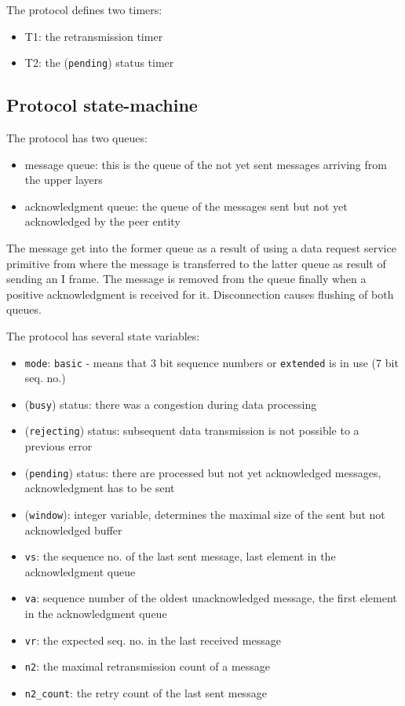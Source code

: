 \documentclass[a4paper]{article}
\begin{document}
The protocol defines two timers:
\begin{itemize}
    \item T1: the retransmission timer
    \item T2: the (\verb!pending!) status timer
\end{itemize}

\subsection{Protocol state-machine}

The protocol has two queues:
\begin{itemize}
    \item message queue: this is the queue of the not yet sent messages arriving from the upper layers
    \item acknowledgment queue: the queue of the messages sent but not yet acknowledged by the peer entity
\end{itemize}

The message get into the former queue as a result of using a data request service primitive from where the message is
transferred to the latter queue as result of sending an I frame. The message is removed from the queue finally when a
positive acknowledgment is received for it. Disconnection causes flushing of both queues.

The protocol has several state variables:
\begin{itemize}
    \item \verb!mode!: \verb!basic! - means that 3 bit sequence numbers or
          \verb!extended! is in use (7 bit seq. no.)
    \item (\verb!busy!) status: there was a congestion during data processing
    \item (\verb!rejecting!) status: subsequent data transmission is not possible to a previous error
    \item (\verb!pending!) status: there are processed but not yet acknowledged messages, acknowledgment
          has to
          be sent
    \item (\verb!window!): integer variable, determines the maximal size of the sent but not acknowledged
          buffer
    \item \verb!vs!: the sequence no. of the last sent message, last element in the acknowledgment
          queue
    \item \verb!va!: sequence number of the oldest unacknowledged message, the first element in the
          acknowledgment queue
    \item \verb!vr!: the expected seq. no. in the last received message
    \item \verb!n2!: the maximal retransmission count of a message
    \item \verb!n2_count!: the retry count of the last sent message
\end{itemize}
\end{document}
